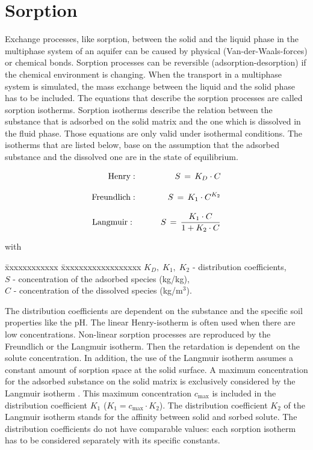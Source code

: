 \section{Sorption}

Exchange processes, like sorption, between the solid and the liquid phase in the multiphase system of an aquifer can be caused by physical (Van-der-Waals-forces) or chemical bonds. Sorption processes can be reversible (adsorption-desorption) if the chemical environment is changing. When the transport in a multiphase system is simulated, the mass exchange between the liquid and the solid phase has to be included. The equations that describe the sorption processes are called sorption isotherms. Sorption isotherms describe the relation between the substance that is adsorbed on the solid matrix and the one which is dissolved in the fluid phase. Those equations are only valid under isothermal conditions. The isotherms that are listed below, base on the assumption that the adsorbed substance and the dissolved one are in the state of equilibrium.

\begin{eqnarray}
\mathrm{Henry:}
& \qquad &
S\,=\,K_D\cdot C \\[2.0ex]
\label{eq58}
%
\mathrm{Freundlich:}
& \qquad &
S\,=\,K_1\cdot C^{K_2} \\[2.0ex]
\label{eq59}
%
\mathrm{Langmuir:\hspace*{0.8ex}}
& \qquad &
S\,=\,\frac{K_1\cdot C}{1+K_2\cdot C}
\label{eq510}
\end{eqnarray}

{\small
with
\begin{tabbing}
\=xxxxxxxxxxxx \=xxxxxxxxxxxxxxxxxx \kill
\> $K_D,\; K_1,\; K_2$ \> - distribution coefficients, \\[1.0ex]
\> $S$ \> - concentration of the adsorbed species (kg/kg), \\[1.0ex]
\> $C$ \> - concentration of the dissolved species (kg/m$^3$).
\end{tabbing}
}

The distribution coefficients are dependent on the substance and the specific soil properties like the pH. The linear Henry-isotherm is often used when there are low concentrations. Non-linear sorption processes are reproduced by the Freundlich or the Langmuir isotherm. Then the retardation is dependent on the solute concentration. In addition, the use of the Langmuir isotherm assumes a constant amount of sorption space at the solid surface. A maximum concentration for the adsorbed substance on the solid matrix is exclusively considered by the Langmuir isotherm \cite{Hab:01}. This maximum concentration $c_{\mathrm{max}}$ is included in the distribution coefficient $K_1$ ($K_1=c_{\mathrm{max}}\cdot K_2$). The distribution coefficient $K_2$ of the Langmuir isotherm stands for the affinity between solid and sorbed solute. The distribution coefficients do not have comparable values: each sorption isotherm has to be considered separately with its specific constants.

